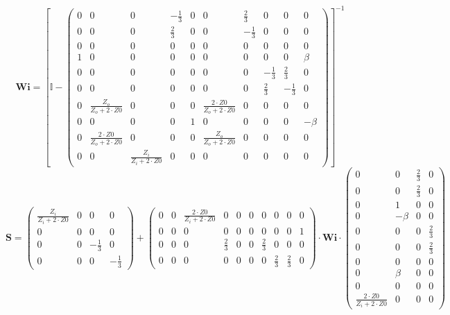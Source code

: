 \[ \mathbf{Wi} =  \left[ \mathbb{I}  - \left(\begin{smallmatrix} 0 & 0
& 0 & -\frac{1}{3} & 0 & 0 & \frac{2}{3} & 0 & 0 & 0 \\ 0 & 0 & 0 &
\frac{2}{3} & 0 & 0 & -\frac{1}{3} & 0 & 0 & 0 \\ 0 & 0 & 0 & 0 & 0 &
0 & 0 & 0 & 0 & 0 \\ 1 & 0 & 0 & 0 & 0 & 0 & 0 & 0 & 0 & \beta \\ 0 &
0 & 0 & 0 & 0 & 0 & 0 & -\frac{1}{3} & \frac{2}{3} & 0 \\ 0 & 0 & 0 &
0 & 0 & 0 & 0 & \frac{2}{3} & -\frac{1}{3} & 0 \\ 0 &
\frac{Z_o}{Z_o+2\cdot Z0} & 0 & 0 & 0 & \frac{2\cdot Z0}{Z_o+2\cdot
Z0} & 0 & 0 & 0 & 0 \\ 0 & 0 & 0 & 0 & 1 & 0 & 0 & 0 & 0 & -\beta \\ 0
& \frac{2\cdot Z0}{Z_o+2\cdot Z0} & 0 & 0 & 0 & \frac{Z_o}{Z_o+2\cdot
Z0} & 0 & 0 & 0 & 0 \\ 0 & 0 & \frac{Z_i}{Z_i+2\cdot Z0} & 0 & 0 & 0 &
0 & 0 & 0 & 0 \end{smallmatrix}\right) \right]^{-1}  \]
\[ \mathbf{S} = \left(\begin{smallmatrix} \frac{Z_i}{Z_i+2\cdot Z0} &
0 & 0 & 0 \\ 0 & 0 & 0 & 0 \\ 0 & 0 & -\frac{1}{3} & 0 \\ 0 & 0 & 0 &
-\frac{1}{3} \end{smallmatrix}\right) + \left(\begin{smallmatrix} 0 &
0 & \frac{2\cdot Z0}{Z_i+2\cdot Z0} & 0 & 0 & 0 & 0 & 0 & 0 & 0 \\ 0 &
0 & 0 & 0 & 0 & 0 & 0 & 0 & 0 & 1 \\ 0 & 0 & 0 & \frac{2}{3} & 0 & 0 &
\frac{2}{3} & 0 & 0 & 0 \\ 0 & 0 & 0 & 0 & 0 & 0 & 0 & \frac{2}{3} &
\frac{2}{3} & 0 \end{smallmatrix}\right) \cdot \mathbf{Wi}
\cdot\left(\begin{smallmatrix} 0 & 0 & \frac{2}{3} & 0 \\ 0 & 0 &
\frac{2}{3} & 0 \\ 0 & 1 & 0 & 0 \\ 0 & -\beta & 0 & 0 \\ 0 & 0 & 0 &
\frac{2}{3} \\ 0 & 0 & 0 & \frac{2}{3} \\ 0 & 0 & 0 & 0 \\ 0 & \beta &
0 & 0 \\ 0 & 0 & 0 & 0 \\ \frac{2\cdot Z0}{Z_i+2\cdot Z0} & 0 & 0 & 0
\end{smallmatrix}\right) \]
